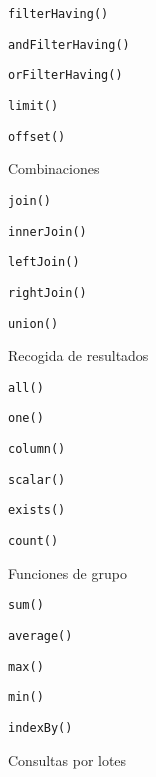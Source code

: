 \begin{longenum}
\begin{longenum}
\begin{longenum}
\begin{longenum}
\begin{longenum}
                    \item \texttt{filterHaving()}
                    \item \texttt{andFilterHaving()}
                    \item \texttt{orFilterHaving()}
                \end{longenum}
                \item \texttt{limit()}
                \item \texttt{offset()}
                \item Combinaciones
                \begin{longenum}
                    \item \texttt{join()}
                    \item \texttt{innerJoin()}
                    \item \texttt{leftJoin()}
                    \item \texttt{rightJoin()}
                \end{longenum}
                \item \texttt{union()}
            \end{longenum}
            \item Recogida de resultados
            \begin{longenum}
                \item \texttt{all()}
                \item \texttt{one()}
                \item \texttt{column()}
                \item \texttt{scalar()}
                \item \texttt{exists()}
                \item \texttt{count()}
                \item Funciones de grupo
                \begin{longenum}
                    \item \texttt{sum()}
                    \item \texttt{average()}
                    \item \texttt{max()}
                    \item \texttt{min()}
                \end{longenum}
                \item \texttt{indexBy()}
            \end{longenum}
            \item Consultas por lotes

\end{longenum}
\end{longenum}
\end{longenum}

